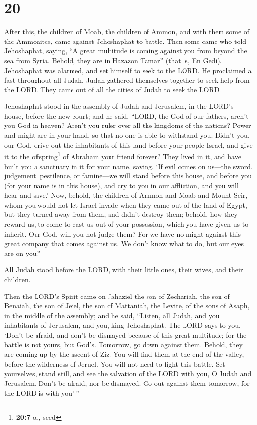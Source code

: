 \hypertarget{section-19}{%
\section{20}\label{section-19}}

 After this, the children of Moab, the children of Ammon,
and with them some of the Ammonites, came against Jehoshaphat to battle.
 Then some came who told Jehoshaphat, saying, ``A great
multitude is coming against you from beyond the sea from Syria. Behold,
they are in Hazazon Tamar'' (that is, En Gedi). 
Jehoshaphat was alarmed, and set himself to seek to the LORD. He
proclaimed a fast throughout all Judah.  Judah gathered
themselves together to seek help from the LORD. They came out of all the
cities of Judah to seek the LORD.

 Jehoshaphat stood in the assembly of Judah and Jerusalem,
in the LORD's house, before the new court;  and he said,
``LORD, the God of our fathers, aren't you God in heaven? Aren't you
ruler over all the kingdoms of the nations? Power and might are in your
hand, so that no one is able to withstand you.  Didn't
you, our God, drive out the inhabitants of this land before your people
Israel, and give it to the offspring\footnote{\textbf{20:7} or, seed} of
Abraham your friend forever?  They lived in it, and have
built you a sanctuary in it for your name, saying,  `If
evil comes on us---the sword, judgement, pestilence, or famine---we will
stand before this house, and before you (for your name is in this
house), and cry to you in our affliction, and you will hear and save.'
 Now, behold, the children of Ammon and Moab and Mount
Seir, whom you would not let Israel invade when they came out of the
land of Egypt, but they turned away from them, and didn't destroy them;
 behold, how they reward us, to come to cast us out of
your possession, which you have given us to inherit.  Our
God, will you not judge them? For we have no might against this great
company that comes against us. We don't know what to do, but our eyes
are on you.''

 All Judah stood before the LORD, with their little ones,
their wives, and their children.

 Then the LORD's Spirit came on Jahaziel the son of
Zechariah, the son of Benaiah, the son of Jeiel, the son of Mattaniah,
the Levite, of the sons of Asaph, in the middle of the assembly;
 and he said, ``Listen, all Judah, and you inhabitants of
Jerusalem, and you, king Jehoshaphat. The LORD says to you, `Don't be
afraid, and don't be dismayed because of this great multitude; for the
battle is not yours, but God's.  Tomorrow, go down
against them. Behold, they are coming up by the ascent of Ziz. You will
find them at the end of the valley, before the wilderness of Jeruel.
 You will not need to fight this battle. Set yourselves,
stand still, and see the salvation of the LORD with you, O Judah and
Jerusalem. Don't be afraid, nor be dismayed. Go out against them
tomorrow, for the LORD is with you.'\,''

